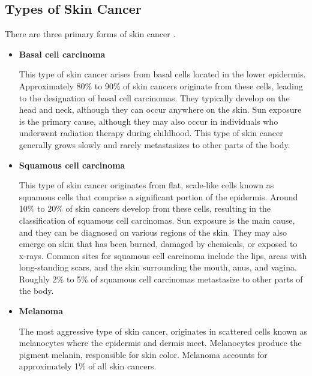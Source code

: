 \subsection{Types of Skin Cancer}

There are three primary forms of skin cancer \cite{BaseCancerKnowledge}.
\newline

\begin{itemize} \item \textbf{Basal cell carcinoma}

      This type of skin cancer arises from basal cells located in the lower
      epidermis. Approximately 80\% to 90\% of skin cancers originate from
      these cells, leading to the designation of basal cell carcinomas. They
      typically develop on the head and neck, although they can occur anywhere
      on the skin. Sun exposure is the primary cause, although they may also
      occur in individuals who underwent radiation therapy during childhood.
      This type of skin cancer generally grows slowly and rarely metastasizes
      to other parts of the body. \newline

    \item \textbf{Squamous cell carcinoma}

      This type of skin cancer originates from flat, scale-like cells known as
      squamous cells that comprise a significant portion of the epidermis.
      Around 10\% to 20\% of skin cancers develop from these cells, resulting
      in the classification of squamous cell carcinomas. Sun exposure is the
      main cause, and they can be diagnosed on various regions of the skin.
      They may also emerge on skin that has been burned, damaged by chemicals,
      or exposed to x-rays. Common sites for squamous cell carcinoma include
      the lips, areas with long-standing scars, and the skin surrounding the
      mouth, anus, and vagina. Roughly 2\% to 5\% of squamous cell carcinomas
      metastasize to other parts of the body. \newline

    \item \textbf{Melanoma}

      The most aggressive type of skin cancer, originates in scattered cells
      known as melanocytes where the epidermis and dermis meet. Melanocytes
      produce the pigment melanin, responsible for skin color. Melanoma
      accounts for approximately 1\% of all skin cancers.

\end{itemize}

